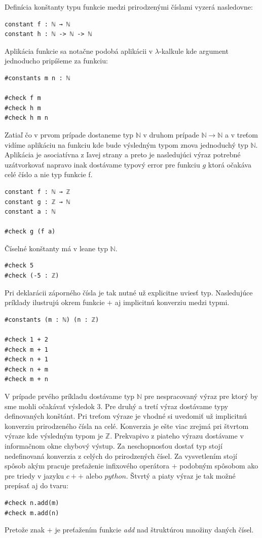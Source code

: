 \documentclass[a4paper,10pt,oneside]{report}%
\begin{document}
    Definícia konštanty typu funkcie medzi prirodzenými číslami vyzerá nasledovne:
\begin{lstlisting}
constant f : ℕ → ℕ
constant h : ℕ -> ℕ -> ℕ
\end{lstlisting}
    Aplikácia funkcie sa notačne podobá aplikácii v $\lambda$-kalkule kde argument
jednoducho pripíšeme za funkciu:
\begin{lstlisting}
#constants m n : ℕ

#check f m
#check h m
#check h m n
\end{lstlisting}
    Zatiaľ čo v prvom prípade dostaneme typ $\mathbb{N}$ v druhom prípade
$\mathbb{N} \to \mathbb{N}$ a v treťom vidíme aplikáciu na funkciu kde bude výsledným
typom znova jednoduchý typ $\mathbb{N}$.
    Aplikácia je asociatívna z ľavej strany a  preto je nasledujúci výraz potrebné 
uzátvorkovať napravo inak dostávame typový error pre funkciu $g$ ktorá očakáva 
celé číslo a nie typ funkcie f.
\begin{lstlisting}
constant f : ℕ → ℤ
constant g : ℤ → ℕ
constant a : ℕ

#check g (f a)
\end{lstlisting}
    Číselné konštanty má v leane typ $\mathbb{N}$.
\begin{lstlisting}
#check 5
#check (-5 : ℤ)
\end{lstlisting}
    Pri deklarácii záporného čísla je tak nutné už explicitne uviesť typ.
Nasledujúce príklady ilustrujú okrem funkcie $+$ aj implicitnú konverziu medzi typmi.
\begin{lstlisting}
#constants (m : ℕ) (n : ℤ)

#check 1 + 2
#check m + 1
#check n + 1
#check n + m
#check m + n
\end{lstlisting}
    V prípade prvého príkladu dostávame typ $\mathbb{N}$ pre nespracovaný výraz pre
ktorý by sme mohli očakávať výsledok $3$.
    Pre druhý a tretí výraz dostávame typy definovaných konštánt.
    Pri treťom výraze je vhodné si uvedomiť už implicitnú konverziu prirodzeného
čísla na celé.
    Konverzia je ešte viac zrejmá pri štvrtom výraze kde výsledným typom je
$\mathbb{Z}$.
    Prekvapivo z piateho výrazu dostávame v informačnom okne chybový výstup.
    Za neschopnosťou dostať typ stojí nedefinovaná konverzia z celých do prirodzených
čísel.
    Za vysvetlením stojí spôsob akým pracuje preťaženie infixového operátora $+$
podobným spôsobom ako pre triedy v jazyku $c++$ alebo $python$. Štvrtý a piaty
výraz je tak možné prepísať aj do tvaru:
\begin{lstlisting}
#check n.add(m)
#check m.add(n)
\end{lstlisting}
    Pretože znak $+$ je preťažením funkcie \emph{add} nad štruktúrou množiny daných
čísel.
\end{document}
